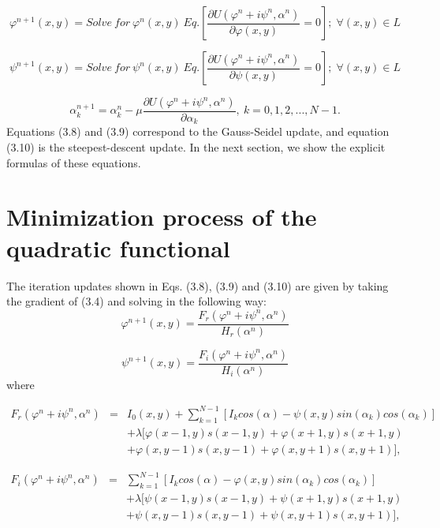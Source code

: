\begin{equation}
\varphi^{n+1}(x,y)=Solve\: for\:\varphi^{n}(x,y)\: Eq.\left[\frac{\partial U(
\varphi^{n}+i\psi^{n},\alpha^{n})}{\partial\varphi(x,y)}=0\right];\;\forall(x,y)
\in L
\end{equation}


\begin{equation}
\psi^{n+1}(x,y)=Solve\: for\:\psi^{n}(x,y)\: Eq.\left[\frac{\partial U(\varphi^{
n}+i\psi^{n},\alpha^{n})}{\partial\psi(x,y)}=0\right];\;\forall(x,y)\in L
\end{equation}


\begin{equation}
\alpha_{k}^{n+1}=\alpha_{k}^{n}-\mu\frac{\partial U(\varphi^{n}+i\psi^{n},
\alpha^{n})}{\partial\alpha_{k}},\: k=0,1,2,...,N-1.
\end{equation}
Equations (3.8) and (3.9) correspond to the Gauss-Seidel update, and equation
(3.10) is the steepest-descent update. In the next section, we show the explicit 
formulas of these equations.

\section{Minimization process of the quadratic functional}

The iteration updates shown in Eqs. (3.8), (3.9) and (3.10) are given by
taking the gradient of (3.4) and solving in the following way:
\begin{equation}
\varphi^{n+1}(x,y)=\frac{F_{r}(\varphi^{n}+i\psi^{n},\alpha^{n})}{H_{r}(\alpha^{
n})}
\end{equation}


\begin{equation}
\psi^{n+1}(x,y)=\frac{F_{i}(\varphi^{n}+i\psi^{n},\alpha^{n})}{H_{i}(\alpha^{n})
}
\end{equation}
where
\begin{footnotesize}
\begin{eqnarray}
F_{r}(\varphi^{n}+i\psi^{n},\alpha^{n}) & = & I_{0}(x,y)+\sum_{k=1}^{N-1}[I_{k}
cos(\alpha)-\psi(x,y)sin(\alpha_{k})cos(\alpha_{k})]\nonumber \\
 &  & +\lambda[\varphi(x-1,y)s(x-1,y)+\varphi(x+1,y)s(x+1,y)\\
 &  & +\varphi(x,y-1)s(x,y-1)+\varphi(x,y+1)s(x,y+1)],\nonumber 
\end{eqnarray}

\begin{eqnarray}
F_{i}(\varphi^{n}+i\psi^{n},\alpha^{n}) & = & \sum_{k=1}^{N-1}[I_{k}cos(\alpha)-
\varphi(x,y)sin(\alpha_{k})cos(\alpha_{k})]\nonumber \\
 &  & +\lambda[\psi(x-1,y)s(x-1,y)+\psi(x+1,y)s(x+1,y)\\
 &  & +\psi(x,y-1)s(x,y-1)+\psi(x,y+1)s(x,y+1)],\nonumber 
\end{eqnarray}
\end{footnotesize}

